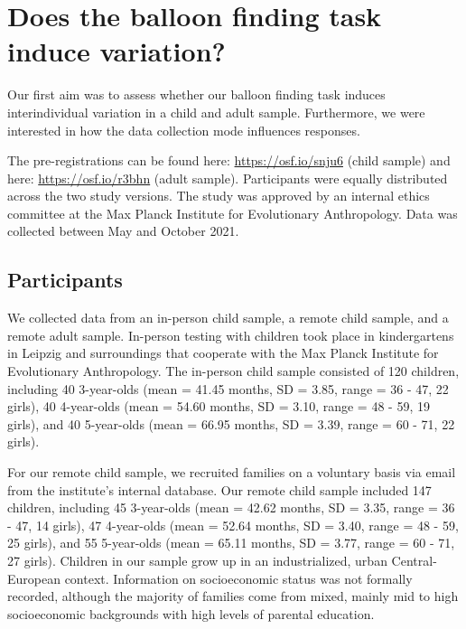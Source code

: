 \documentclass[
  man,floatsintext]{apa6}
\begin{document}
\hypertarget{does-the-balloon-finding-task-induce-variation}{%
\section{Does the balloon finding task induce variation?}\label{does-the-balloon-finding-task-induce-variation}}

Our first aim was to assess whether our balloon finding task induces interindividual variation in a child and adult sample. Furthermore, we were interested in how the data collection mode influences responses.

The pre-registrations can be found here: \url{https://osf.io/snju6} (child sample) and here: \url{https://osf.io/r3bhn} (adult sample). Participants were equally distributed across the two study versions. The study was approved by an internal ethics committee at the Max Planck Institute for Evolutionary Anthropology. Data was collected between May and October 2021.

\hypertarget{participants}{%
\subsection{Participants}\label{participants}}

We collected data from an in-person child sample, a remote child sample, and a remote adult sample.
In-person testing with children took place in kindergartens in Leipzig and surroundings that cooperate with the Max Planck Institute for Evolutionary Anthropology. The in-person child sample consisted of
120 children, including
40 3-year-olds
(mean = 41.45 months,
SD = 3.85,
range = 36
- 47,
22 girls),
40 4-year-olds
(mean = 54.60 months,
SD = 3.10,
range = 48
- 59,
19 girls),
and 40 5-year-olds
(mean = 66.95 months,
SD = 3.39,
range = 60
- 71,
22 girls).

For our remote child sample, we recruited families on a voluntary basis via email from the institute's internal database. Our remote child sample included 147 children, including
45 3-year-olds
(mean = 42.62 months,
SD = 3.35,
range = 36
- 47,
14 girls),
47 4-year-olds
(mean = 52.64 months,
SD = 3.40,
range = 48
- 59,
25 girls),
and 55 5-year-olds
(mean = 65.11 months,
SD = 3.77,
range = 60
- 71,
27 girls). Children in our sample grow up in an industrialized, urban Central-European context. Information on socioeconomic status was not formally recorded, although the majority of families come from mixed, mainly mid to high socioeconomic backgrounds with high levels of parental education.
\end{document}
